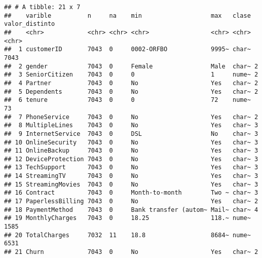 \documentclass[
]{article}
\begin{document}
\begin{verbatim}
## # A tibble: 21 x 7
##    varible          n     na    min                   max   clase valor_distinto
##    <chr>            <chr> <chr> <chr>                 <chr> <chr> <chr>         
##  1 customerID       7043  0     0002-ORFBO            9995~ char~ 7043          
##  2 gender           7043  0     Female                Male  char~ 2             
##  3 SeniorCitizen    7043  0     0                     1     nume~ 2             
##  4 Partner          7043  0     No                    Yes   char~ 2             
##  5 Dependents       7043  0     No                    Yes   char~ 2             
##  6 tenure           7043  0     0                     72    nume~ 73            
##  7 PhoneService     7043  0     No                    Yes   char~ 2             
##  8 MultipleLines    7043  0     No                    Yes   char~ 3             
##  9 InternetService  7043  0     DSL                   No    char~ 3             
## 10 OnlineSecurity   7043  0     No                    Yes   char~ 3             
## 11 OnlineBackup     7043  0     No                    Yes   char~ 3             
## 12 DeviceProtection 7043  0     No                    Yes   char~ 3             
## 13 TechSupport      7043  0     No                    Yes   char~ 3             
## 14 StreamingTV      7043  0     No                    Yes   char~ 3             
## 15 StreamingMovies  7043  0     No                    Yes   char~ 3             
## 16 Contract         7043  0     Month-to-month        Two ~ char~ 3             
## 17 PaperlessBilling 7043  0     No                    Yes   char~ 2             
## 18 PaymentMethod    7043  0     Bank transfer (autom~ Mail~ char~ 4             
## 19 MonthlyCharges   7043  0     18.25                 118.~ nume~ 1585          
## 20 TotalCharges     7032  11    18.8                  8684~ nume~ 6531          
## 21 Churn            7043  0     No                    Yes   char~ 2
\end{verbatim}
\end{document}
